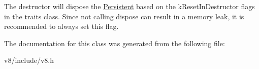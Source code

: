 The destructor will dispose the \mbox{\hyperlink{classv8_1_1Persistent}{Persistent}} based on the k\+Reset\+In\+Destructor flags in the traits class. Since not calling dispose can result in a memory leak, it is recommended to always set this flag. 

The documentation for this class was generated from the following file\+:\begin{DoxyCompactItemize}
\item 
v8/include/v8.\+h\end{DoxyCompactItemize}

